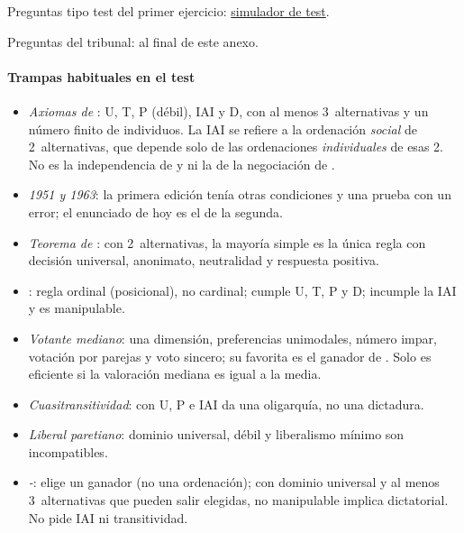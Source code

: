 \documentclass[11pt]{article}
\begin{document}
\begin{anotaciones}
Preguntas tipo test del primer ejercicio: \href{https://www.victorgutierrezmarcos.es/oposicion/temario/primer-ejercicio/test/simulador.html?tema=3.A.24}{simulador de test}.

Preguntas del tribunal: al final de este anexo.
\end{anotaciones}

\paragraph{Trampas habituales en el test}

\begin{itemize}
\item \emph{Axiomas de }: U, T, P (débil), IAI y D, con al menos 3~alternativas y un número finito de individuos. La IAI se refiere a la ordenación \emph{social} de 2~alternativas, que depende solo de las ordenaciones \emph{individuales} de esas 2. No es la independencia de  y  ni la de la negociación de .
\item \emph{1951 y 1963}: la primera edición tenía otras condiciones y una prueba con un error\nocite{Blau1957Existence}; el enunciado de hoy es el de la segunda.
\item \emph{Teorema de }\nocite{May1952Set}: con 2~alternativas, la mayoría simple es la única regla con decisión universal, anonimato, neutralidad y respuesta positiva.
\item \emph{}: regla ordinal (posicional), no cardinal; cumple U, T, P y D; incumple la IAI y es manipulable.
\item \emph{Votante mediano}\nocite{Black1948Rationale}: una dimensión, preferencias unimodales, número impar, votación por parejas y voto sincero; su favorita es el ganador de . Solo es eficiente si la valoración mediana es igual a la media\nocite{Bowen1943Interpretation}.
\item \emph{Cuasitransitividad}: con U, P e IAI da una oligarquía\nocite{Gibbard2014Intransitive,MasColellSonnenschein1972General}, no una dictadura.
\item \emph{Liberal paretiano}\nocite{Sen1970Impossibility}: dominio universal,  débil y liberalismo mínimo son incompatibles.
\item \emph{-}: elige un ganador (no una ordenación); con dominio universal y al menos 3~alternativas que pueden salir elegidas, no manipulable implica dictatorial. No pide IAI ni transitividad.

\end{itemize}
\end{document}
